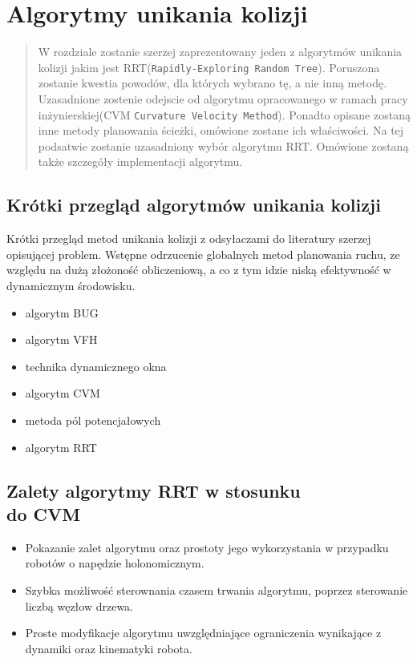 \chapter{Algorytmy unikania kolizji}
\begin{abstract}
 W rozdziale zostanie szerzej zaprezentowany jeden z algorytmów unikania kolizji jakim jest RRT(\texttt{Rapidly-Exploring Random Tree}).
Poruszona zostanie kwestia powodów, dla których wybrano tę, a nie inną metodę. Uzasadnione zostenie odejscie od algorytmu opracowanego w ramach pracy 
inżynierskiej(CVM \texttt{Curvature Velocity Method}). Ponadto opisane zostaną inne metody planowania ścieżki, omówione zostane ich właściwości. Na tej podsatwie zostanie 
uzasadniony wybór algorytmu RRT. Omówione zostaną także szczegóły implementacji algorytmu.
\end{abstract}

	\section{Krótki przegląd algorytmów unikania kolizji}
	Krótki przegląd metod unikania kolizji  z odsyłaczami do literatury szerzej opisującej problem. 
	Wstępne odrzucenie globalnych metod planowania ruchu, ze względu na dużą złożoność obliczeniową,
	a co z tym idzie  niską efektywność w dynamicznym środowisku.
	
	\begin{itemize}
	\item algorytm BUG
 	\item algorytm VFH
	\item technika dynamicznego okna	
	\item algorytm CVM
	\item metoda pól potencjałowych
	\item algorytm RRT
	\end{itemize}
	
	\section{Zalety algorytmy RRT w stosunku \\do CVM}
	\begin{itemize}
	 \item Pokazanie zalet algorytmu oraz prostoty jego wykorzystania w przypadku robotów o napędzie holonomicznym.
	 \item Szybka możliwość sterownania czasem trwania algorytmu, poprzez sterowanie liczbą węzłow drzewa.
	 \item Proste modyfikacje algorytmu uwzględniające ograniczenia wynikające z dynamiki oraz kinematyki robota.
	\end{itemize}
	
